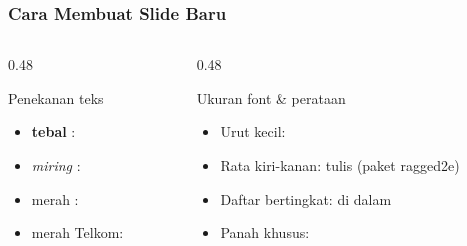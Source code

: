 \begin{frame}
    \frametitle{Cara Membuat Slide Baru}   %


    \begin{columns}[T]          %
        \begin{column}{0.48\textwidth}   %
            \begin{block}{Penekanan teks}
                \footnotesize
                \begin{itemize}
                    \item \textbf{tebal}  : 
                    \item \textit{miring} : 
                    \item \alert{merah}   : 
                    \item \textcolor{telu}{merah Telkom}:\\
                          \code{\textcolor{telu}{...}}
                \end{itemize}
            \end{block}
        \end{column}

        \begin{column}{0.48\textwidth}
            \begin{block}{Ukuran font \& perataan}
                \footnotesize
                \begin{itemize}
                    \item[\textcolor{scisGold}{$\Rightarrow$}] Urut kecil:
                          \code{\tiny < \small < \normalsize}
                    \item[\textcolor{scisGold}{$\Rightarrow$}] Rata kiri-kanan:
                          tulis \code{\justifying} (paket ragged2e)
                    \item[\textcolor{scisGold}{$\Rightarrow$}] Daftar bertingkat:
                          \code{\item} di dalam \code{\item}
                    \item[\textcolor{scisGold}{$\Rightarrow$}] Panah khusus:
                          \code{\item[$\Rightarrow$]}
                \end{itemize}
            \end{block}
        \end{column}
    \end{columns}
\end{frame}

